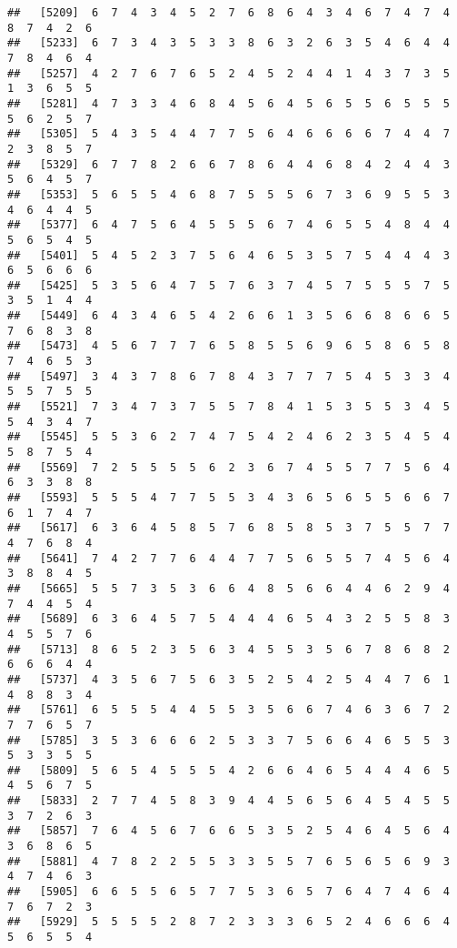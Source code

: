 \documentclass[
]{book}
\begin{document}
\begin{verbatim}
##   [5209]  6  7  4  3  4  5  2  7  6  8  6  4  3  4  6  7  4  7  4  8  7  4  2  6
##   [5233]  6  7  3  4  3  5  3  3  8  6  3  2  6  3  5  4  6  4  4  7  8  4  6  4
##   [5257]  4  2  7  6  7  6  5  2  4  5  2  4  4  1  4  3  7  3  5  1  3  6  5  5
##   [5281]  4  7  3  3  4  6  8  4  5  6  4  5  6  5  5  6  5  5  5  5  6  2  5  7
##   [5305]  5  4  3  5  4  4  7  7  5  6  4  6  6  6  6  7  4  4  7  2  3  8  5  7
##   [5329]  6  7  7  8  2  6  6  7  8  6  4  4  6  8  4  2  4  4  3  5  6  4  5  7
##   [5353]  5  6  5  5  4  6  8  7  5  5  5  6  7  3  6  9  5  5  3  4  6  4  4  5
##   [5377]  6  4  7  5  6  4  5  5  5  6  7  4  6  5  5  4  8  4  4  5  6  5  4  5
##   [5401]  5  4  5  2  3  7  5  6  4  6  5  3  5  7  5  4  4  4  3  6  5  6  6  6
##   [5425]  5  3  5  6  4  7  5  7  6  3  7  4  5  7  5  5  5  7  5  3  5  1  4  4
##   [5449]  6  4  3  4  6  5  4  2  6  6  1  3  5  6  6  8  6  6  5  7  6  8  3  8
##   [5473]  4  5  6  7  7  7  6  5  8  5  5  6  9  6  5  8  6  5  8  7  4  6  5  3
##   [5497]  3  4  3  7  8  6  7  8  4  3  7  7  7  5  4  5  3  3  4  5  5  7  5  5
##   [5521]  7  3  4  7  3  7  5  5  7  8  4  1  5  3  5  5  3  4  5  5  4  3  4  7
##   [5545]  5  5  3  6  2  7  4  7  5  4  2  4  6  2  3  5  4  5  4  5  8  7  5  4
##   [5569]  7  2  5  5  5  5  6  2  3  6  7  4  5  5  7  7  5  6  4  6  3  3  8  8
##   [5593]  5  5  5  4  7  7  5  5  3  4  3  6  5  6  5  5  6  6  7  6  1  7  4  7
##   [5617]  6  3  6  4  5  8  5  7  6  8  5  8  5  3  7  5  5  7  7  4  7  6  8  4
##   [5641]  7  4  2  7  7  6  4  4  7  7  5  6  5  5  7  4  5  6  4  3  8  8  4  5
##   [5665]  5  5  7  3  5  3  6  6  4  8  5  6  6  4  4  6  2  9  4  7  4  4  5  4
##   [5689]  6  3  6  4  5  7  5  4  4  4  6  5  4  3  2  5  5  8  3  4  5  5  7  6
##   [5713]  8  6  5  2  3  5  6  3  4  5  5  3  5  6  7  8  6  8  2  6  6  6  4  4
##   [5737]  4  3  5  6  7  5  6  3  5  2  5  4  2  5  4  4  7  6  1  4  8  8  3  4
##   [5761]  6  5  5  5  4  4  5  5  3  5  6  6  7  4  6  3  6  7  2  7  7  6  5  7
##   [5785]  3  5  3  6  6  6  2  5  3  3  7  5  6  6  4  6  5  5  3  5  3  3  5  5
##   [5809]  5  6  5  4  5  5  5  4  2  6  6  4  6  5  4  4  4  6  5  4  5  6  7  5
##   [5833]  2  7  7  4  5  8  3  9  4  4  5  6  5  6  4  5  4  5  5  3  7  2  6  3
##   [5857]  7  6  4  5  6  7  6  6  5  3  5  2  5  4  6  4  5  6  4  3  6  8  6  5
##   [5881]  4  7  8  2  2  5  5  3  3  5  5  7  6  5  6  5  6  9  3  4  7  4  6  3
##   [5905]  6  6  5  5  6  5  7  7  5  3  6  5  7  6  4  7  4  6  4  7  6  7  2  3
##   [5929]  5  5  5  5  2  8  7  2  3  3  3  6  5  2  4  6  6  6  4  5  6  5  5  4

\end{verbatim}
\end{document}
